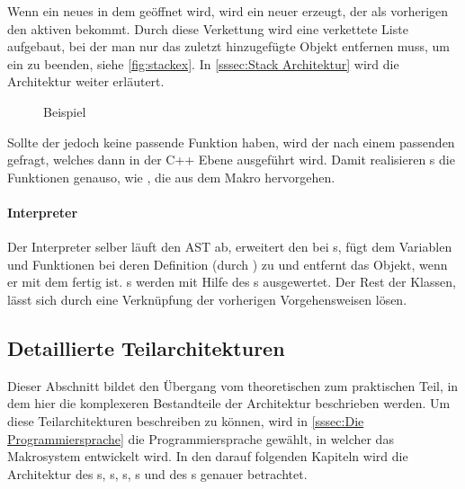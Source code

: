         Wenn ein neues  in dem  geöffnet wird, wird ein neuer  erzeugt, der als vorherigen  den aktiven  bekommt. Durch diese Verkettung wird eine verkettete Liste aufgebaut, bei der man nur das zuletzt hinzugefügte Objekt entfernen muss, um ein  zu beenden, siehe \autoref{fig:stackex}. In \autoref{sssec:Stack Architektur} wird die Architektur weiter erläutert.
        \begin{figure}[H]
          \centering
          \caption{ Beispiel}
          \label{fig:stackex}
        \end{figure}

        Sollte der  jedoch keine passende Funktion haben, wird der  nach einem passenden  gefragt, welches dann in der C++ Ebene ausgeführt wird. Damit realisieren s die  Funktionen genauso, wie , die aus dem Makro hervorgehen.

      \paragraph{Interpreter}
        Der Interpreter selber läuft den AST ab, erweitert den  bei s, fügt dem  Variablen und Funktionen bei deren Definition (durch ) zu und entfernt das  Objekt, wenn er mit dem  fertig ist. s werden mit Hilfe des s ausgewertet. Der Rest der  Klassen, lässt sich durch eine Verknüpfung der vorherigen Vorgehensweisen lösen.

  \subsection{Detaillierte Teilarchitekturen}
  \label{ssec:Detaillierte Teilarchitekturen}
    Dieser Abschnitt bildet den Übergang vom theoretischen zum praktischen Teil, in dem hier die komplexeren Bestandteile der Architektur beschrieben werden. Um diese Teilarchitekturen beschreiben zu können, wird in \autoref{sssec:Die Programmiersprache} die Programmiersprache gewählt, in welcher das Makrosystem entwickelt wird. In den darauf folgenden Kapiteln wird die Architektur des s, s, s, s und des s genauer betrachtet.

